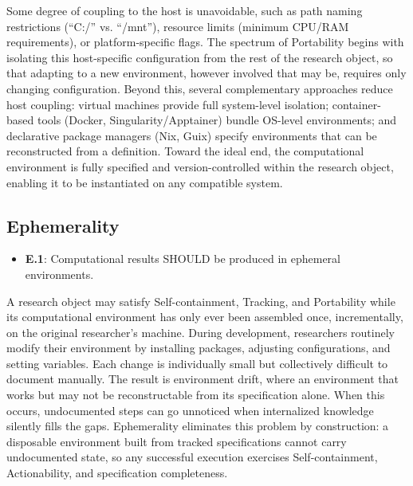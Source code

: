 \documentclass{article}
\makeatletter
\newcommand{\hyanchor}[1]{\texorpdfstring{\Hy@raisedlink{\hypertarget{#1}{}}}{}}
\newcommand{\anchoredsubsection}[2]{\subsection[#2]{\hyanchor{#1}#2}}
\makeatother
\begin{document}
Some degree of coupling to the host is unavoidable, such as path naming restrictions (``C:/'' vs. ``/mnt''), resource limits (minimum CPU/RAM requirements), or platform-specific flags.
The spectrum of Portability begins with isolating this host-specific configuration from the rest of the research object, so that adapting to a new environment, however involved that may be, requires only changing configuration.
Beyond this, several complementary approaches reduce host coupling: virtual machines provide full system-level isolation; container-based tools (Docker, Singularity/Apptainer) bundle OS-level environments; and declarative package managers (Nix, Guix) specify environments that can be reconstructed from a definition.
Toward the ideal end, the computational environment is fully specified and version-controlled within the research object, enabling it to be instantiated on any compatible system.



\anchoredsubsection{ephemerality}{Ephemerality}

\begin{itemize}
    \item \textbf{E.1}: Computational results SHOULD be produced in ephemeral environments.
\end{itemize}

A research object may satisfy Self-containment, Tracking, and Portability while its computational environment has only ever been assembled once, incrementally, on the original researcher's machine.
During development, researchers routinely modify their environment by installing packages, adjusting configurations, and setting variables.
Each change is individually small but collectively difficult to document manually.
The result is environment drift, where an environment that works but may not be reconstructable from its specification alone.
When this occurs, undocumented steps can go unnoticed when internalized knowledge silently fills the gaps.
Ephemerality eliminates this problem by construction: a disposable environment built from tracked specifications cannot carry undocumented state, so any successful execution exercises Self-containment, Actionability, and specification completeness.
\end{document}
